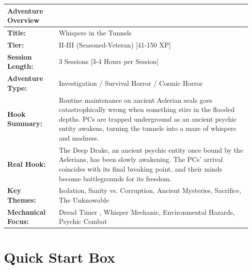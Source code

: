 \documentclass[11pt]{article}
\begin{document}




\begin{center}
\begin{longtable}{|p{2.5cm}|p{12cm}|}
\hline
\textbf{Adventure Overview} & \\
\hline
\textbf{Title:} & Whispers in the Tunnels \\
\textbf{Tier:} & II-III (Seasoned-Veteran) [41-150 XP] \\
\textbf{Session Length:} & 3 Sessions [3-4 Hours per Session] \\
\textbf{Adventure Type:} & Investigation / Survival Horror / Cosmic Horror \\
\textbf{Hook Summary:} & Routine maintenance on ancient Aelerian seals goes catastrophically wrong when something stirs in the flooded depths. PCs are trapped underground as an ancient psychic entity awakens, turning the tunnels into a maze of whispers and madness. \\
\textbf{Real Hook:} & The Deep Drake, an ancient psychic entity once bound by the Aelerians, has been slowly awakening. The PCs' arrival coincides with its final breaking point, and their minds become battlegrounds for its freedom. \\
\textbf{Key Themes:} & Isolation, Sanity vs. Corruption, Ancient Mysteries, Sacrifice, The Unknowable \\
\textbf{Mechanical Focus:} & Dread Timer , Whisper Mechanic, Environmental Hazards, Psychic Combat \\
\hline
\end{longtable}
\end{center}


\section{Quick Start Box}
\end{document}
